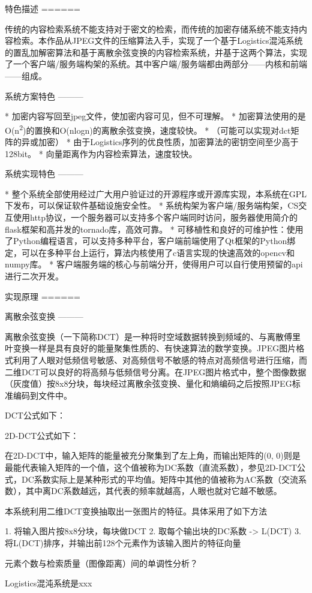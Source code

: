 特色描述 ======

传统的内容检索系统不能支持对于密文的检索，而传统的加密存储系统不能支持内容检索。本作品从JPEG文件的压缩算法入手，实现了一个基于Logistics混沌系统的置乱加解密算法和基于离散余弦变换的内容检索系统，并基于这两个算法，实现了一个客户端/服务端构架的系统。其中客户端/服务端都由两部分------内核和前端------组成。

系统方案特色 ---------

* 加密内容写回至jpeg文件，使加密内容可见，但不可理解。 *
加密算法使用的是O(n\textsuperscript{2})的置换和O(nlogn)的离散余弦变换，速度较快。
* （可能可以实现对dct矩阵的异或加密） *
由于Logistics序列的优良性质，加密算法的密钥空间至少高于128bit。 *
向量距离作为内容检索算法，速度较快。

系统实现特色 ---------

*
整个系统全部使用经过广大用户验证过的开源程序或开源库实现，本系统在GPL下发布，可以保证软件基础设施安全性。
*
系统构架为客户端/服务端构架，CS交互使用http协议，一个服务器可以支持多个客户端同时访问，服务器使用简介的flask框架和高并发的tornado库，高效可靠。
*
可移植性和良好的可维护性：使用了Python编程语言，可以支持多种平台，客户端前端使用了Qt框架的Python绑定，可以在多种平台上运行，算法内核使用了c语言实现的快速高效的opencv和numpy库。
*
客户端服务端的核心与前端分开，使得用户可以自行使用预留的api进行二次开发。

实现原理 ======

离散余弦变换 ---------

离散余弦变换（一下简称DCT）是一种将时空域数据转换到频域的、与离散傅里叶变换一样是具有良好的能量聚集性质的、有快速算法的数学变换。JPEG图片格式利用了人眼对低频信号敏感、对高频信号不敏感的特点对高频信号进行压缩，而二维DCT可以良好的将高频与低频信号分离。在JPEG图片格式中，整个图像数据（灰度值）按8x8分块，每块经过离散余弦变换、量化和熵编码之后按照JPEG标准编码到文件中。

DCT公式如下：

2D-DCT公式如下：

在2D-DCT中，输入矩阵的能量被充分聚集到了左上角，而输出矩阵的(0,
0)则是最能代表输入矩阵的一个值，这个值被称为DC系数（直流系数），参见2D-DCT公式，DC系数实际上是某种形式的平均值。矩阵中其他的值被称为AC系数（交流系数），其中离DC系数越远，其代表的频率就越高，人眼也就对它越不敏感。

本系统利用二维DCT变换抽取出一张图片的特征。具体采用了如下方法

1. 将输入图片按8x8分块，每块做DCT 2. 取每个输出块的DC系数
-\textgreater{} L(DCT) 3.
将L(DCT)排序，并输出前128个元素作为该输入图片的特征向量

元素个数与检索质量（图像距离）间的单调性分析？

Logistics混沌系统是xxx
